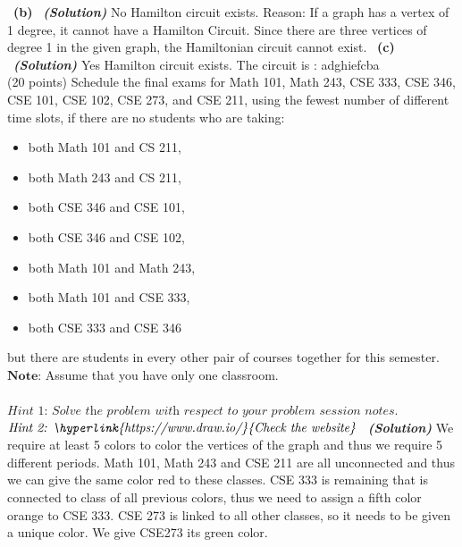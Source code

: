 \documentclass[a4 paper]{article}
\numberwithin{equation}{section}
\newcommand{\problem}[2]{~\\\fbox{\textbf{Problem #1}}\hfill (#2 points)\newline\newline}
\newcommand{\subproblem}[1]{~\newline\textbf{(#1)}}
\newcommand{\solution}{~\newline\textbf{\textit{(Solution)}} }
\newcommand{\0}{\mathbf{0}}
\begin{document}
\subproblem{b} \solution
\newline No Hamilton circuit exists.
\newline Reason: If a graph has a vertex of 1 degree, it cannot have a Hamilton Circuit. Since there are three vertices of degree 1 in the given graph, the Hamiltonian circuit cannot exist.
\subproblem{c} \solution
\newline Yes Hamilton circuit exists. 
\newline The circuit is :
a\rightarrow d\rightarrow g\rightarrow h\rightarrow i\rightarrow e\rightarrow f\rightarrow c\rightarrow b\rightarrow a
\newpage
\problem{3: Applications on Graphs}{20}
Schedule the final exams for Math 101, Math 243, CSE 333, CSE 346, CSE 101, CSE 102, CSE 273, and CSE 211, using the fewest number of different time slots, if there are no students who are taking:
\begin{itemize}
	\item both Math 101 and CS 211,
	\item both Math 243 and CS 211,
	\item both CSE 346 and CSE 101,
	\item both CSE 346 and CSE 102,
	\item both Math 101 and Math 243,
	\item both Math 101 and CSE 333,
	\item both CSE 333 and CSE 346
\end{itemize}
but there are students in every other pair of courses together for this semester.\\ 
$\textbf{Note:}$ Assume that you have only one classroom.\\ \\
$\textit{Hint 1: Solve the problem with respect to your problem session notes.}$\\
$\textit{Hint 2: \hyperlink{https://www.draw.io/}{Check the website}}$
\newline
\solution
\newline
\newline We require at least 5 colors to color the vertices of the graph and thus we require 5 different periods.
\newline Math 101, Math 243 and CSE 211 are all unconnected and thus we can give the same color red to these classes.
\newline CSE 333 is remaining that is connected to class of all previous colors, thus we need to assign a fifth color orange to CSE 333.
\newline    CSE 273 is linked to all other classes, so it needs to be given a unique color.  We give CSE273 its green color.
\end{document}
